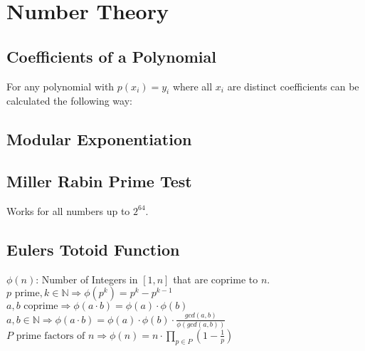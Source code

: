 \section{Number Theory}

\subsection{Coefficients of a Polynomial}
For any polynomial with $p(x_i) = y_i$ where all $x_i$ are distinct
coefficients can be calculated the following way:

\subsection{Modular Exponentiation}

\subsection{Miller Rabin Prime Test}
Works for all numbers up to $2^{64}$.


\subsection{Eulers Totoid Function}
$\phi(n)$: Number of Integers in $[1, n]$ that are coprime to $n$.\\
$p \text{ prime}, k \in \mathbb{N} \Rightarrow \phi(p^k) = p^k - p^{k-1}$ \\
$a, b \text{ coprime} \Rightarrow \phi(a \cdot b) = \phi(a) \cdot \phi(b)$ \\
$a, b \in \mathbb{N} \Rightarrow \phi(a \cdot b) = \phi(a) \cdot \phi(b) \cdot \frac{gcd(a, b)}{\phi(gcd(a,b))}$ \\
$P \text{ prime factors of } n \Rightarrow \phi(n) = n \cdot \prod_{p \in P} (1 - \frac{1}{p})$



